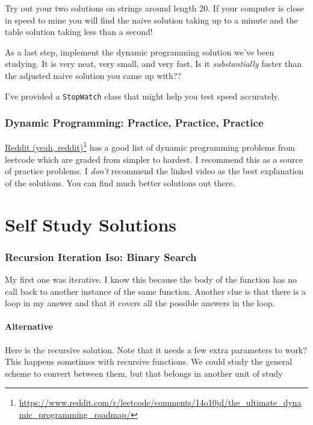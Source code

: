 \documentclass[twoside=false,DIV=14]{scrartcl}
\begin{document}
Try out your two solutions on strings around length 20.  If your computer is close in speed to mine  you will find the naive solution taking up to a minute and the table solution taking less than a second!

As a last step, implement the dynamic programming solution we've been studying.  It is very neat, very small, and very fast.  Is it \emph{substantially} faster than the adjusted naive solution you came up with??

I've provided a \verb|StopWatch| class that might help you test speed accurately.

\section{Dynamic Programming: Practice, Practice, Practice}

\href{https://www.reddit.com/r/leetcode/comments/14o10jd/the_ultimate_dynamic_programming_roadmap/}{Reddit (yeah, reddit)}\footnote{\url{https://www.reddit.com/r/leetcode/comments/14o10jd/the_ultimate_dynamic_programming_roadmap/}} has a good list of dynamic programming problems from leetcode which are graded from simpler to hardest.   I recommend this as a source of practice problems.  I \emph{don't} recommend the linked video as the best explanation of the solutions.  You can find much better solutions out there.
 
\newpage\setcounter{section}{0}
\part*{Self Study Solutions}

\section{Recursion Iteration Iso: Binary Search}
My first one was iterative.  I know this because the body of the function has no call back to another instance of the same function.  Another clue is that there is a loop in my answer and that it covers all the possible answers in the loop.

\subsection{Alternative}
Here is the recursive solution.  Note that it needs a few extra parameters to work?  This happens sometimes with recursive functions.  We could study the general scheme to convert between them, but that belongs in another unit of study
\end{document}
